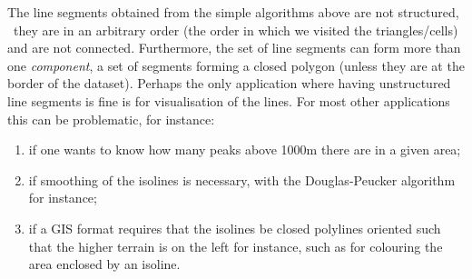 The line segments obtained from the simple algorithms above are not structured, \ie\ they are in an arbitrary order (the order in which we visited the triangles/cells) and are not connected.
Furthermore, the set of line segments can form more than one \emph{component}, a set of segments forming a closed polygon (unless they are at the border of the dataset).
Perhaps the only application where having unstructured line segments is fine is for visualisation of the lines.
For most other applications this can be problematic, for instance:
\begin{enumerate}
  \item if one wants to know how many peaks above 1000m there are in a given area;
  \item if smoothing of the isolines is necessary, with the Douglas-Peucker algorithm for instance;
  \item if a GIS format requires that the isolines be closed polylines oriented such that the higher terrain is on the left for instance, such as for colouring the area enclosed by an isoline.
\end{enumerate}

%

